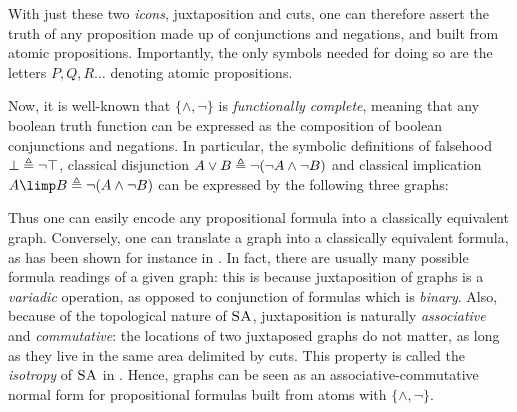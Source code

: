 With just these two \emph{icons}, juxtaposition and cuts, one can therefore
assert the truth of any proposition made up of conjunctions and negations, and
built from atomic propositions. Importantly, the only symbols needed for doing
so are the letters $P, Q, R\ldots$ denoting atomic propositions.

Now, it is well-known that $\{\land,\neg\}$ is \emph{functionally complete},
meaning that any boolean truth function can be expressed as the composition of
boolean conjunctions and negations. In particular, the symbolic definitions of
falsehood $\bot \triangleq \neg\top$, classical disjunction $A \lor B \triangleq
\neg(\neg A \land \neg B)$ and classical implication $A \limp B \defeq \neg (A
\land \neg B)$ can be expressed by the following three graphs:
Thus one can easily encode any propositional formula into a classically
equivalent graph. Conversely, one can translate a graph into a classically
equivalent formula, as has been shown for instance in
. In fact, there are usually many
possible formula readings of a given graph: this is because juxtaposition of
graphs is a \emph{variadic} operation, as opposed to conjunction of formulas
which is \emph{binary}. Also, because of the topological nature of $\textsc{SA}$,
juxtaposition is naturally \emph{associative} and \emph{commutative}: the
locations of two juxtaposed graphs do not matter, as long as they live in the
same area delimited by cuts. This property is called the \emph{isotropy} of
$\textsc{SA}$ in \cite{minghui_graphical_2019}. Hence, graphs can be seen as an
associative-commutative normal form for propositional formulas built from atoms
with $\{\land,\neg\}$.

